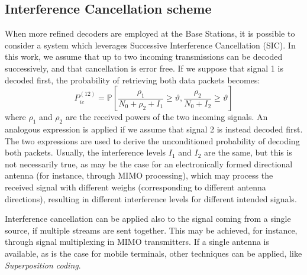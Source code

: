 \documentclass[12pt, letterpaper, onecolumn, draftcls]{IEEEtran}
\begin{document}
\subsection{Interference Cancellation scheme}
\label{sec:intcanc}
When more refined decoders are employed at the Base Stations, it is possible to consider a system which leverages Successive Interference Cancellation (SIC). In this work, we assume that up to two incoming transmissions can be decoded successively, and that cancellation is error free. If we suppose that signal 1 is decoded first, the probability of retrieving both data packets becomes:
\begin{equation}
 P_{ic}^{(12)} = \mathbb{P}\left[\frac{\rho_1}{N_0+\rho_2+I_1}\geq\vartheta, \frac{\rho_2}{N_0+I_2}\geq\vartheta\right]
\end{equation}
where $\rho_1$ and $\rho_2$ are the received powers of the two incoming signals. An analogous expression is applied if we assume that signal 2 is instead decoded first. The two expressions are used to derive the unconditioned probability of decoding both packets.
Usually, the interference levels $I_1$ and $I_2$ are the same, but this is not necessarily true, as may be the case for an electronically formed directional antenna (for instance, through MIMO processing), which may process the received signal with different weighs (corresponding to different antenna directions), resulting in different interference levels for different intended signals.

Interference cancellation can be applied also to the signal coming from a single source, if multiple streams are sent together. This may be achieved, for instance, through signal multiplexing in MIMO transmitters. If a single antenna is available, as is the case for mobile terminals, other techniques can be applied, like \textit{Superposition coding}.
\end{document}
